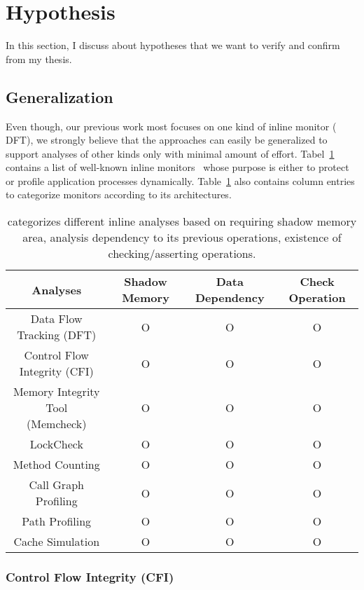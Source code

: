 \section{Hypothesis} \label{sec:hypo} 

In this section, I discuss about hypotheses that we want to verify and confirm
from my thesis.

\subsection{\sreplica Generalization}

Even though, our previous work most focuses on one kind of inline monitor (\ie
DFT), we strongly believe that the approaches can easily be generalized to
support analyses of other kinds only with minimal amount of effort.
Tabel~\ref{tab:analyses} contains a list of well-known inline
monitors~\cite{CAB} whose purpose is either to protect or profile application
processes dynamically. Table~\ref{tab:analyses} also contains column entries to
categorize monitors according to its architectures. 

\begin{table}[h]
\begin{tabular}{|c|c|c|c|}
\hline
Analyses & Shadow Memory & Data Dependency & Check Operation \\ 
\hline \hline
Data Flow Tracking (DFT) & O & O & O \\ \hline
Control Flow Integrity (CFI) & O & O & O \\ \hline
\specialcell{Memory Integrity Tool \\ (Memcheck)} & O & O & O \\ \hline
LockCheck & O & O & O \\ \hline
Method Counting & O & O & O \\ \hline
Call Graph Profiling & O & O & O \\ \hline
Path Profiling & O & O & O \\ \hline
Cache Simulation & O & O & O \\ \hline
\end{tabular}
\caption{ categorizes different inline analyses based on requiring shadow
memory area, analysis dependency to its previous operations, existence of
checking/asserting operations. \label{tab:analyses}}
\end{table}

\subsubsection{Control Flow Integrity (CFI)}
